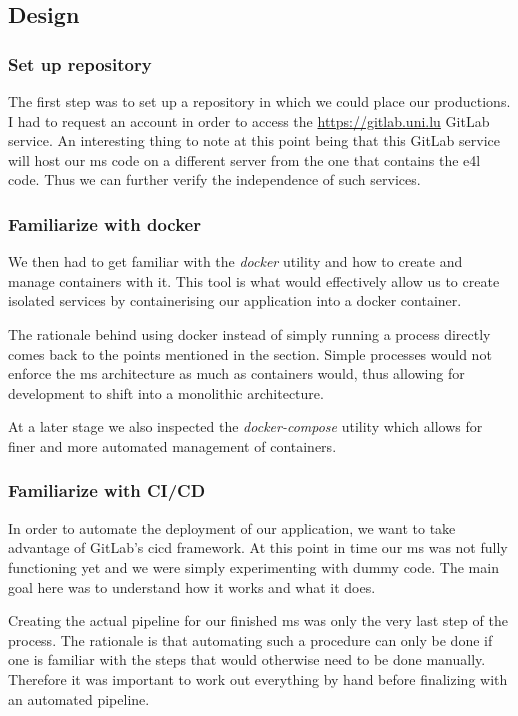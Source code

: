 \subsection{Design}

\subsubsection{Set up repository}

The first step was to set up a repository in which we could place our
productions. I had to request an account in order to access the
\url{https://gitlab.uni.lu} GitLab service. An interesting thing to
note at this point being that this GitLab service will host our
\gls{ms} code on a different server from the one that contains the
\gls{e4l} code. Thus we can further verify the independence of such
services.

\subsubsection{Familiarize with docker}

We then had to get familiar with the \textit{docker} utility and how
to create and manage containers with it. This tool is what would
effectively allow us to create isolated services by containerising our
application into a docker container.

The rationale behind using docker instead of simply running a process
directly comes back to the points mentioned in the
 section. Simple processes would not
enforce the \gls{ms} architecture as much as containers would, thus
allowing for development to shift into a monolithic architecture.

At a later stage we also inspected the \textit{docker-compose}
utility which allows for finer and more automated management of
containers.

\subsubsection{Familiarize with CI/CD}

In order to automate the deployment of our application, we want to
take advantage of GitLab's \gls{cicd} framework. At this point in time
our \gls{ms} was not fully functioning yet and we were simply
experimenting with dummy code. The main goal here was to understand
how it works and what it does.

Creating the actual pipeline for our finished \gls{ms} was only the
very last step of the process. The rationale is that automating such a
procedure can only be done if one is familiar with the steps that
would otherwise need to be done manually. Therefore it was important
to work out everything by hand before finalizing with an automated
pipeline.

